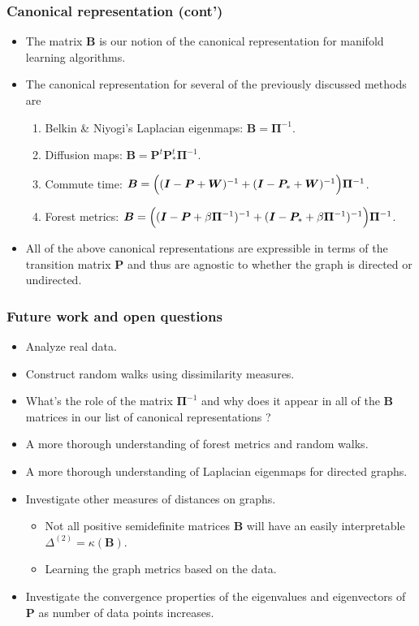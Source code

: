 \documentclass[professionalfonts,hyperref={colorlinks=true,linkcolor=red}]{beamer}
\begin{document}
\begin{frame}
  \frametitle{Canonical representation (cont')}
  \begin{itemize}
  \item<1-> The matrix $\bm{B}$ is our notion of the canonical
    representation for manifold learning algorithms. 
  \item<2-> The canonical representation for several of the previously
    discussed methods are
    \begin{enumerate}
    \item<3-> Belkin \& Niyogi's Laplacian eigenmaps: $\bm{B} = \bm{\Pi}^{-1}$.
    \item<4-> Diffusion maps: $\bm{B} = \bm{P}^{t} \bm{P}_{*}^{t}
      \bm{\Pi}^{-1}$.
    \item<5-> Commute time: $\bm{B} = \Bigl((\bm{I} - \bm{P} +
      \bm{W})^{-1} + (\bm{I} - \bm{P}_{*} + \bm{W})^{-1}\Bigr)
      \bm{\Pi}^{-1}$.
    \item<6-> Forest metrics: $\bm{B} = \Bigl((\bm{I} - \bm{P} + \beta
      \bm{\Pi}^{-1})^{-1} + (\bm{I} - \bm{P}_{*} + \beta
      \bm{\Pi}^{-1})^{-1}\Bigr) \bm{\Pi}^{-1}$.
    \end{enumerate}
  \item<7->
    All of the above canonical representations are expressible
    in terms of the transition matrix $\bm{P}$ and thus are agnostic to
    whether the graph is directed or undirected. 
  \end{itemize}
\end{frame}
\begin{frame}
  \frametitle{Future work and open questions}
  \begin{itemize}[<+->]
  \item Analyze \alert{real} data.
  \item Construct random walks using dissimilarity measures.
  \item What's the role of the matrix $\bm{\Pi}^{-1}$ and why does it
    appear in all of the $\bm{B}$ matrices in our list of canonical
    representations ? 
  \item A more thorough understanding of forest metrics and random walks.
  \item A more thorough understanding of Laplacian eigenmaps for
    directed graphs.
  \item Investigate other measures of distances on graphs.
    \begin{itemize}
      \item Not all positive semidefinite matrices $\bm{B}$ will have
        an easily interpretable $\Delta^{(2)} = \kappa(\bm{B})$.
      \item Learning the graph metrics based on the data.   
    \end{itemize}
  \item Investigate the convergence properties of the eigenvalues and
    eigenvectors of $\bm{P}$ as number of data points increases.
  \end{itemize}
\end{frame}
\end{document}
